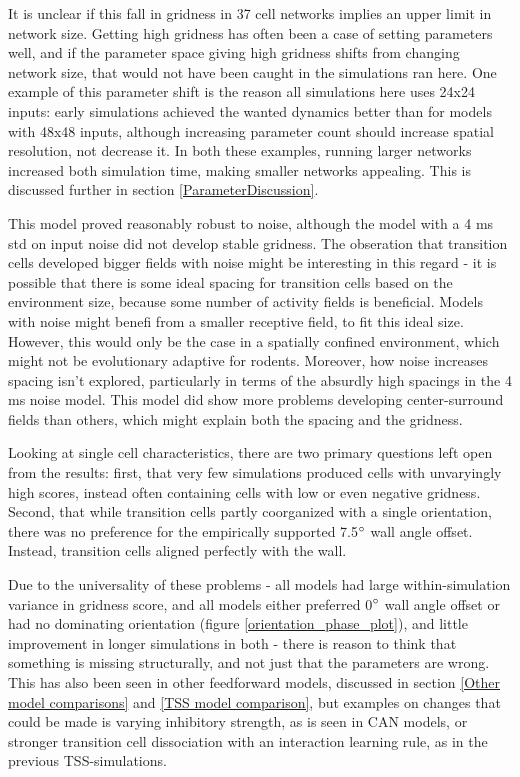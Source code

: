 \documentclass{article}
\begin{document}
    It is unclear if this fall in gridness in 37 cell networks implies an upper limit in network size. Getting high gridness has often been a case of setting parameters well, and if the parameter space giving high gridness shifts from changing network size, that would not have been caught in the simulations ran here. One example of this parameter shift is the reason all simulations here uses 24x24 inputs: early simulations achieved the wanted dynamics better than for models with 48x48 inputs, although increasing parameter count should increase spatial resolution, not decrease it. In both these examples, running larger networks increased both simulation time, making smaller networks appealing. This is discussed further in section \ref{ParameterDiscussion}.
    
    This model proved reasonably robust to noise, although the model with a 4 ms std on input noise did not develop stable gridness. The obseration that transition cells developed bigger fields with noise might be interesting in this regard - it is possible that there is some ideal spacing for transition cells based on the environment size, because some number of activity fields is beneficial. Models with noise might benefi from a smaller receptive field, to fit this ideal size. However, this would only be the case in a spatially confined environment, which might not be evolutionary adaptive for rodents. Moreover, how noise increases spacing isn't explored, particularly in terms of the absurdly high spacings in the 4 ms noise model. This model did show more problems developing center-surround fields than others, which might explain both the spacing and the gridness.

    Looking at single cell characteristics, there are two primary questions left open from the results: first, that very few simulations produced cells with unvaryingly high scores, instead often containing cells with low or even negative gridness. Second, that while transition cells partly coorganized with a single orientation, there was no preference for the empirically supported 7.5\(\degree\) wall angle offset. Instead, transition cells aligned perfectly with the wall.

    Due to the universality of these problems - all models had large within-simulation variance in gridness score, and all models either preferred 0\(\degree\) wall angle offset or had no dominating orientation (figure \ref{orientation_phase_plot}), and little improvement in longer simulations in both - there is reason to think that something is missing structurally, and not just that the parameters are wrong. This has also been seen in other feedforward models, discussed in section \ref{Other model comparisons} and \ref{TSS model comparison}, but examples on changes that could be made is varying inhibitory strength, as is seen in CAN models, or stronger transition cell dissociation with an interaction learning rule, as in the previous TSS-simulations.
\end{document}
